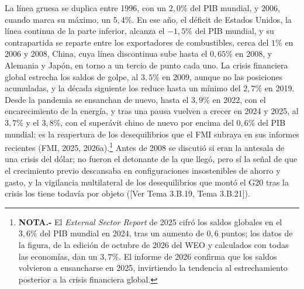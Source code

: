 \documentclass[10pt,a4paper]{article}
\newcommand{\authorfont}[1]{{\fontfamily{EBGaramond-TLF}\selectfont #1}}
\begin{document}
La línea gruesa se duplica entre 1996, con un $2{,}0\%$ del PIB mundial, y 2006, cuando marca su máximo, un $5{,}4\%$. En ese año, el déficit de Estados Unidos, la línea continua de la parte inferior, alcanza el $-1{,}5\%$ del PIB mundial, y su contrapartida se reparte entre los exportadores de combustibles, cerca del $1\%$ en 2006 y 2008, China, cuya línea discontinua sube hasta el $0{,}65\%$ en 2008, y Alemania y Japón, en torno a un tercio de punto cada uno. La crisis financiera global estrecha los saldos de golpe, al $3{,}5\%$ en 2009, aunque no las posiciones acumuladas, y la década siguiente los reduce hasta un mínimo del $2{,}7\%$ en 2019. Desde la pandemia se ensanchan de nuevo, hasta el $3{,}9\%$ en 2022, con el encarecimiento de la energía, y tras una pausa vuelven a crecer en 2024 y 2025, al $3{,}7\%$ y el $3{,}8\%$, con el superávit chino de nuevo por encima del $0{,}6\%$ del PIB mundial: es la reapertura de los desequilibrios que el FMI subraya en sus informes recientes (FMI, 2025, 2026a).\footnote{%
    \textbf{NOTA.-} El \textit{External Sector Report} de 2025 cifró los saldos globales en el $3{,}6\%$ del PIB mundial en 2024, tras un aumento de $0{,}6$ puntos; los datos de la figura, de la edición de octubre de 2026 del WEO y calculados con todas las economías, dan un $3{,}7\%$. El informe de 2026 confirma que los saldos volvieron a ensancharse en 2025, invirtiendo la tendencia al estrechamiento posterior a la crisis financiera global.
} Antes de 2008 se discutió si eran la antesala de una crisis del dólar; no fueron el detonante de la que llegó, pero sí la señal de que el crecimiento previo descansaba en configuraciones insostenibles de ahorro y gasto, y la vigilancia multilateral de los desequilibrios que montó el G20 tras la crisis los tiene todavía por objeto ([\authorfont{Ver Tema 3.B.19, Tema 3.B.21}]).
\end{document}
